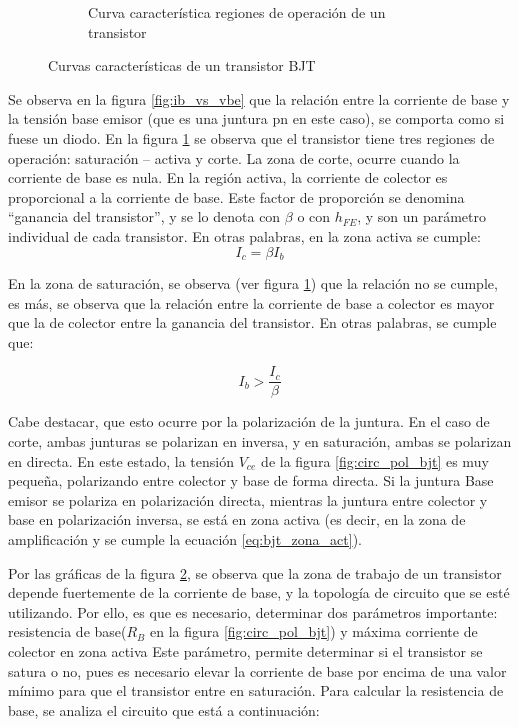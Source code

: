 \begin{figure}[h!]
\begin{center}
\begin{subfigure}{0.4\linewidth}
		\caption{Curva característica regiones de operación de un transistor}
		\label{fig:Ic_vs_vce}
	\end{subfigure}
\end{center}
\caption{Curvas características de un transistor BJT}
\label{fig:curvas_bjt}
\end{figure}

Se observa en la figura \ref{fig:ib_vs_vbe} que la relación entre la corriente de base y la tensión base emisor (que es una juntura pn en este caso), se comporta como si fuese un diodo.  En la figura \ref{fig:Ic_vs_vce} se observa que el transistor tiene tres regiones de operación: saturación – activa y corte. La zona de corte, ocurre cuando la corriente de base es nula. En la región activa, la corriente de colector es proporcional a la corriente de base. Este factor de proporción se denomina ``ganancia del transistor'', y se lo denota con $\beta$ o con $h_{FE}$, y son un parámetro individual de cada transistor. En otras palabras, en la zona activa se cumple: 
\begin{equation} \label{eq:bjt_zona_act}
	I_c = \beta I_b
\end{equation}

En la zona de saturación, se observa (ver figura \ref{fig:Ic_vs_vce}) que la relación no se cumple, es más, se observa que la relación entre la corriente de base a colector es mayor que la de colector entre la ganancia del transistor. En otras palabras, se cumple que: 	

\begin{equation}
	I_b > \frac{I_c}{\beta} 
\end{equation}

Cabe destacar, que esto ocurre por la polarización de la juntura. En el caso de corte, ambas junturas se polarizan en inversa, y en saturación, ambas se polarizan en directa. En este estado, la tensión $V_{ce}$ de la figura \ref{fig:circ_pol_bjt} es muy pequeña, polarizando entre colector y base de forma directa. Si la juntura Base emisor se polariza en polarización directa, mientras la juntura entre colector y base en polarización inversa, se está en zona activa (es decir, en la zona de amplificación y se cumple la ecuación \ref{eq:bjt_zona_act}). 

Por las gráficas de la figura \ref{fig:curvas_bjt}, se observa que la zona de trabajo de un transistor depende fuertemente de la corriente de base, y la topología de circuito que se esté utilizando. Por ello, es que es necesario, determinar dos parámetros importante: resistencia de base($R_B$ en la figura \ref{fig:circ_pol_bjt}) y máxima corriente de colector en zona activa Este parámetro, permite determinar si el transistor se satura o no, pues es necesario elevar la corriente de base por encima de una valor mínimo para que el transistor entre en saturación.  
Para calcular la resistencia de base, se analiza el circuito que está a continuación: 


